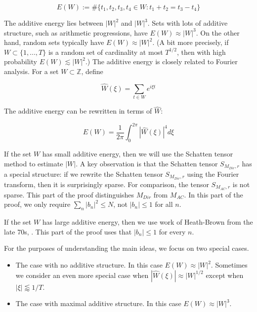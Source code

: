 \documentclass{amsart}
\newcommand{\ZZ}{\mathbb{Z}}
\begin{document}
\begin{equation} \label{defE}
E(W) := \# \{ t_1, t_2, t_3, t_4 \in W: t_1 + t_2 = t_3 -t_4 \}
\end{equation}

\noindent The additive energy lies between $|W|^2$ and $|W|^3$.   Sets with lots of additive structure,  such as arithmetic progressions,  have $E(W) \approx |W|^3$.   On the other hand,  random sets typically have $E(W) \approx |W|^2$.   (A bit more precisely,  if $W \subset \{1,  ..., T\}$ is a random set of cardinality at most $T^{1/2}$,  then with high probability $E(W) \lesssim |W|^2$.)   The additive energy is closely related to Fourier analysis.  For a set $W \subset \ZZ$, define

\begin{equation} \label{defhatW} \hat W(\xi) = \sum_{t \in W} e^{i \xi t}
\end{equation}

The additive energy can be rewritten in terms of $\hat W$:

\begin{equation} \label{energyfourier} E(W) = \frac{1}{2 \pi} \int_0^{2 \pi} |\hat W(\xi)|^4 d \xi
\end{equation} 


If the set $W$ has small additive energy, then we will use the Schatten tensor method to estimate $|W|$.   A key observation is that the Schatten tensor $S_{M_{Dir}, r}$ has a special structure: if we rewrite the Schatten tensor $S_{M_{Dir}, r}$ using the Fourier transform, then it is surprisingly sparse.   For comparison, the tensor $S_{M_{AC}, r}$ is not sparse.   This part of the proof distinguishes $M_{Dir}$ from $M_{AC}$.  In this part of the proof, we only require $\sum_n |b_n|^2 \le N$, not $|b_n| \le 1$ for all $n$.  

If the set $W$ has large additive energy, then we use work of Heath-Brown from the late 70s, \cite{HB}.  This part of the proof uses that $|b_n| \le 1$ for every $n$.  

For the purposes of understanding the main ideas, we focus on two special cases.

\begin{itemize}

\item The case with no additive structure.  In this case $E(W) \approx |W|^2$.  Sometimes we consider an even more special case when $|\hat W(\xi)| \approx |W|^{1/2}$ except when $|\xi| \lessapprox 1/T$.  

\item The case with maximal additive structure.  In this case $E(W) \approx |W|^3$.  

\end{itemize}
\end{document}
